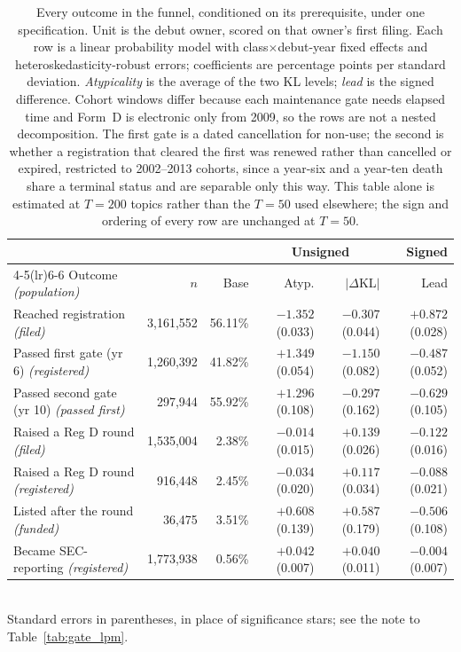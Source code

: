 \begin{table}[h]\centering\footnotesize
\caption{Every outcome in the funnel, conditioned on its prerequisite, under one specification. Unit is the debut owner, scored on that owner's first filing. Each row is a linear probability model with class$\times$debut-year fixed effects and heteroskedasticity-robust errors; coefficients are percentage points per standard deviation. \emph{Atypicality} is the average of the two KL levels; \emph{lead} is the signed difference. Cohort windows differ because each maintenance gate needs elapsed time and Form~D is electronic only from 2009, so the rows are not a nested decomposition. The first gate is a dated cancellation for non-use; the second is whether a registration that cleared the first was renewed rather than cancelled or expired, restricted to 2002--2013 cohorts, since a year-six and a year-ten death share a terminal status and are separable only this way. This table alone is estimated at $T = 200$ topics rather than the $T = 50$ used elsewhere; the sign and ordering of every row are unchanged at $T = 50$.}
\label{tab:staged}
\begin{tabular}{lrrrrr}
\toprule
 & & & \multicolumn{2}{c}{Unsigned} & Signed \\
\cmidrule(lr){4-5}\cmidrule(lr){6-6}
Outcome \emph{(population)} & $n$ & Base & Atyp. & $|\Delta$KL$|$ & Lead \\
\midrule
Reached registration \emph{(filed)} & 3,161,552 & 56.11\% & $-1.352$ (0.033) & $-0.307$ (0.044) & $+0.872$ (0.028) \\
Passed first gate (yr 6) \emph{(registered)} & 1,260,392 & 41.82\% & $+1.349$ (0.054) & $-1.150$ (0.082) & $-0.487$ (0.052) \\
Passed second gate (yr 10) \emph{(passed first)} & 297,944 & 55.92\% & $+1.296$ (0.108) & $-0.297$ (0.162) & $-0.629$ (0.105) \\
Raised a Reg D round \emph{(filed)} & 1,535,004 & 2.38\% & $-0.014$ (0.015) & $+0.139$ (0.026) & $-0.122$ (0.016) \\
Raised a Reg D round \emph{(registered)} & 916,448 & 2.45\% & $-0.034$ (0.020) & $+0.117$ (0.034) & $-0.088$ (0.021) \\
Listed after the round \emph{(funded)} & 36,475 & 3.51\% & $+0.608$ (0.139) & $+0.587$ (0.179) & $-0.506$ (0.108) \\
Became SEC-reporting \emph{(registered)} & 1,773,938 & 0.56\% & $+0.042$ (0.007) & $+0.040$ (0.011) & $-0.004$ (0.007) \\
\bottomrule
\end{tabular}
\\[0.3em]\footnotesize Standard errors in parentheses, in place of significance stars; see the note to Table~\ref{tab:gate_lpm}.
\end{table}